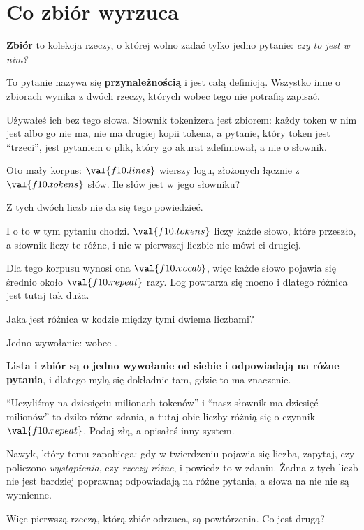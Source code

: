 \section{Co zbiór wyrzuca}
\label{sec:F10-sets}

\begin{fr}
\textbf{Zbiór} to kolekcja rzeczy, o której wolno zadać tylko jedno pytanie:
\emph{czy to jest w nim?}

To pytanie nazywa się \textbf{przynależnością} i jest całą definicją. Wszystko
inne o zbiorach wynika z dwóch rzeczy, których wobec tego nie potrafią
zapisać.

Używałeś ich bez tego słowa. Słownik tokenizera jest zbiorem: każdy token w nim
jest albo go nie ma, nie ma drugiej kopii tokena, a pytanie, który token jest
\enquote{trzeci}, jest pytaniem o plik, który go akurat zdefiniował, a nie o
słownik.

Oto mały korpus: $\val{f10.lines}$ wierszy logu, złożonych łącznie z
$\val{f10.tokens}$ słów. Ile słów jest w jego słowniku?
\nextframe
\end{fr}

\begin{fr}
\begin{ansblock}
Z tych dwóch liczb nie da się tego powiedzieć.
\end{ansblock}

I o to w tym pytaniu chodzi. $\val{f10.tokens}$ liczy każde słowo, które
przeszło, a słownik liczy te różne, i nic w pierwszej liczbie nie mówi ci
drugiej.

Dla tego korpusu wynosi ona $\val{f10.vocab}$, więc każde słowo pojawia się
średnio około $\val{f10.repeat}$ razy. Log powtarza się mocno i dlatego różnica
jest tutaj tak duża.

Jaka jest różnica w kodzie między tymi dwiema liczbami?
\nextframe
\end{fr}

\begin{fr}
\begin{ansblock}
Jedno wywołanie:  wobec .
\end{ansblock}

\begin{trapbox}
\textbf{Lista i zbiór są o jedno wywołanie od siebie i odpowiadają na różne
pytania}, i dlatego mylą się dokładnie tam, gdzie to ma znaczenie.

\enquote{Uczyliśmy na dziesięciu milionach tokenów} i \enquote{nasz słownik ma
dziesięć milionów} to dziko różne zdania, a tutaj obie liczby różnią się o
czynnik $\val{f10.repeat}$. Podaj złą, a opisałeś inny system.

Nawyk, który temu zapobiega: gdy w twierdzeniu pojawia się liczba, zapytaj, czy
policzono \emph{wystąpienia}, czy \emph{rzeczy różne}, i powiedz to w zdaniu.
Żadna z tych liczb nie jest bardziej poprawna; odpowiadają na różne pytania, a
słowa na nie nie są wymienne.
\end{trapbox}

Więc pierwszą rzeczą, którą zbiór odrzuca, są powtórzenia. Co jest drugą?
\nextframe
\end{fr}

